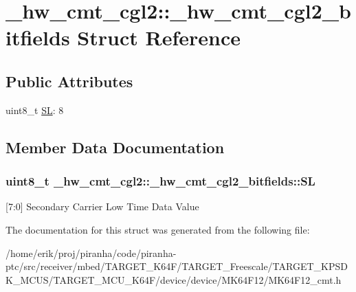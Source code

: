 \hypertarget{struct__hw__cmt__cgl2_1_1__hw__cmt__cgl2__bitfields}{}\section{\+\_\+hw\+\_\+cmt\+\_\+cgl2\+:\+:\+\_\+hw\+\_\+cmt\+\_\+cgl2\+\_\+bitfields Struct Reference}
\label{struct__hw__cmt__cgl2_1_1__hw__cmt__cgl2__bitfields}
\subsection*{Public Attributes}
\begin{DoxyCompactItemize}
\item 
uint8\+\_\+t \hyperlink{struct__hw__cmt__cgl2_1_1__hw__cmt__cgl2__bitfields_a63a0fea44005cd7949328fd662bbda94}{SL}\+: 8
\end{DoxyCompactItemize}


\subsection{Member Data Documentation}
\subsubsection[{\texorpdfstring{SL}{SL}}]{\setlength{\rightskip}{0pt plus 5cm}uint8\+\_\+t \+\_\+hw\+\_\+cmt\+\_\+cgl2\+::\+\_\+hw\+\_\+cmt\+\_\+cgl2\+\_\+bitfields\+::\+SL}\hypertarget{struct__hw__cmt__cgl2_1_1__hw__cmt__cgl2__bitfields_a63a0fea44005cd7949328fd662bbda94}{}\label{struct__hw__cmt__cgl2_1_1__hw__cmt__cgl2__bitfields_a63a0fea44005cd7949328fd662bbda94}
\mbox{[}7\+:0\mbox{]} Secondary Carrier Low Time Data Value 

The documentation for this struct was generated from the following file\+:\begin{DoxyCompactItemize}
\item 
/home/erik/proj/piranha/code/piranha-\/ptc/src/receiver/mbed/\+T\+A\+R\+G\+E\+T\+\_\+\+K64\+F/\+T\+A\+R\+G\+E\+T\+\_\+\+Freescale/\+T\+A\+R\+G\+E\+T\+\_\+\+K\+P\+S\+D\+K\+\_\+\+M\+C\+U\+S/\+T\+A\+R\+G\+E\+T\+\_\+\+M\+C\+U\+\_\+\+K64\+F/device/device/\+M\+K64\+F12/M\+K64\+F12\+\_\+cmt.\+h\end{DoxyCompactItemize}
